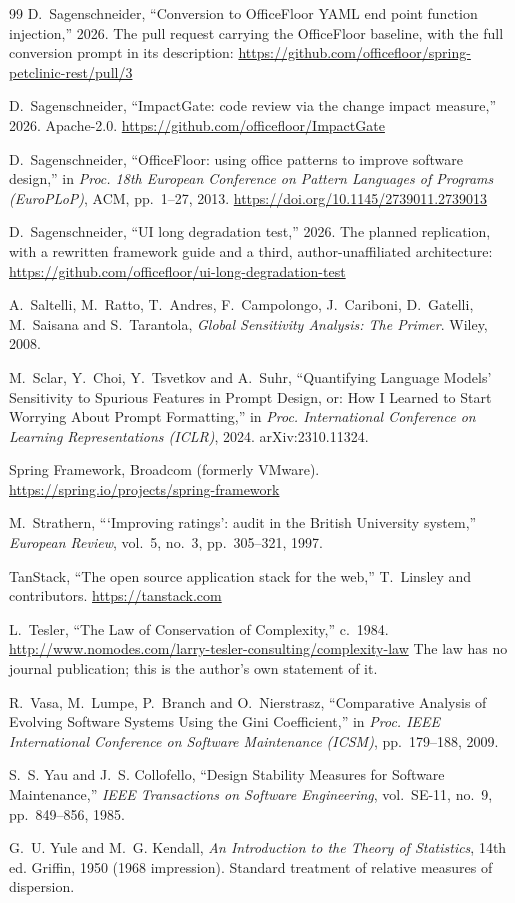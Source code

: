 \documentclass[11pt,a4paper]{article}
\begin{document}
\begin{thebibliography}{99}
 D.~Sagenschneider,
  ``Conversion to OfficeFloor YAML end point function injection,'' 2026.
  The pull request carrying the OfficeFloor baseline, with the full conversion
  prompt in its description:
  \url{https://github.com/officefloor/spring-petclinic-rest/pull/3}

 D.~Sagenschneider,
  ``ImpactGate: code review via the change impact measure,'' 2026. Apache-2.0.
  \url{https://github.com/officefloor/ImpactGate}

 D.~Sagenschneider,
  ``OfficeFloor: using office patterns to improve software design,''
  in \emph{Proc. 18th European Conference on Pattern Languages of Programs
  (EuroPLoP)}, ACM, pp.~1--27, 2013. \url{https://doi.org/10.1145/2739011.2739013}

 D.~Sagenschneider,
  ``UI long degradation test,'' 2026.
  The planned replication, with a rewritten framework guide and a third,
  author-unaffiliated architecture:
  \url{https://github.com/officefloor/ui-long-degradation-test}

 A.~Saltelli, M.~Ratto, T.~Andres, F.~Campolongo,
  J.~Cariboni, D.~Gatelli, M.~Saisana and S.~Tarantola,
  \emph{Global Sensitivity Analysis: The Primer}. Wiley, 2008.

 M.~Sclar, Y.~Choi, Y.~Tsvetkov and A.~Suhr,
  ``Quantifying Language Models' Sensitivity to Spurious Features in Prompt
  Design, or: How I Learned to Start Worrying About Prompt Formatting,''
  in \emph{Proc. International Conference on Learning Representations (ICLR)},
  2024. arXiv:2310.11324.

 Spring Framework, Broadcom (formerly VMware).
  \url{https://spring.io/projects/spring-framework}

 M.~Strathern,
  ```Improving ratings': audit in the British University system,''
  \emph{European Review}, vol.~5, no.~3, pp.~305--321, 1997.

 TanStack,
  ``The open source application stack for the web,'' T.~Linsley and contributors.
  \url{https://tanstack.com}

 L.~Tesler,
  ``The Law of Conservation of Complexity,'' c.~1984.
  \url{http://www.nomodes.com/larry-tesler-consulting/complexity-law}
  The law has no journal publication; this is the author's own statement of it.

 R.~Vasa, M.~Lumpe, P.~Branch and O.~Nierstrasz,
  ``Comparative Analysis of Evolving Software Systems Using the Gini
  Coefficient,'' in \emph{Proc. IEEE International Conference on Software
  Maintenance (ICSM)}, pp.~179--188, 2009.

 S.~S. Yau and J.~S. Collofello,
  ``Design Stability Measures for Software Maintenance,''
  \emph{IEEE Transactions on Software Engineering}, vol.~SE-11, no.~9,
  pp.~849--856, 1985.

 G.~U. Yule and M.~G. Kendall,
  \emph{An Introduction to the Theory of Statistics}, 14th ed. Griffin, 1950
  (1968 impression). Standard treatment of relative measures of dispersion.
\end{thebibliography}
\end{document}

